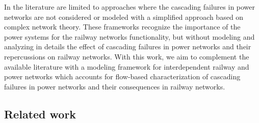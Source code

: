\documentclass[review]{elsarticle}
\begin{document}
	In the literature are limited to approaches where the cascading failures in power networks are not considered or modeled with a simplified approach based on complex network theory. These frameworks recognize the importance of the power systems for the railway networks functionality, but without modeling and analyzing in details the effect of cascading failures in power networks and their repercussions on railway networks. With this work, we aim to complement the available literature with a modeling framework for interdependent railway and power networks which accounts for flow-based characterization of cascading failures in power networks and their consequences in railway networks.
	
	\subsection{Related work}
\end{document}
